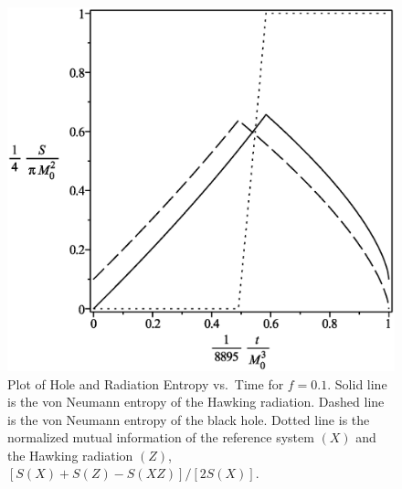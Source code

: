 \documentclass[12pt]{article}
\begin{document}
\newpage

\begin{figure}[H]
\centering
\includegraphics[width=1\textwidth]{Hawking-hole-radiation-mutual-entropy-vs-time-graph-10f-is-1.eps}
\caption{Plot of Hole and Radiation Entropy vs.\ Time for $f=0.1$.
Solid line is the von Neumann entropy of the Hawking radiation.
Dashed line is the von Neumann entropy of the black hole.
Dotted line is the normalized mutual information of the reference system $(X)$ and the Hawking radiation $(Z)$, $[S(X)+S(Z)-S(XZ)]/[2S(X)]$.}
\end{figure}
\end{document}
